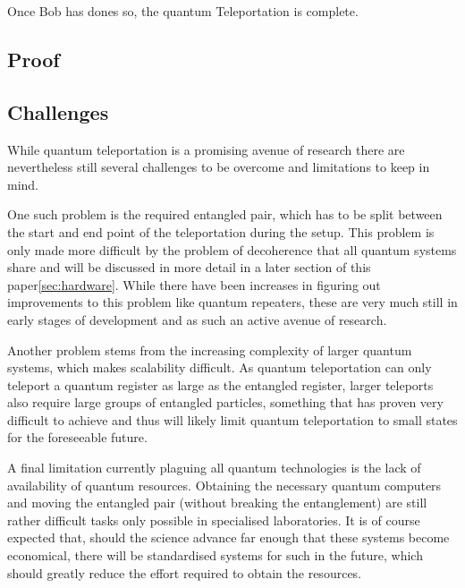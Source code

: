 Once Bob has dones so, the quantum Teleportation is complete.
\subsection{Proof}\label{subsec:proof2}

\subsection{Challenges}\label{subsec:challenges}
While quantum teleportation is a promising avenue of research there are nevertheless still several challenges to be
overcome and limitations to keep in mind.

One such problem is the required entangled pair, which has to be split between the start and end point of the teleportation
during the setup.
This problem is only made more difficult by the problem of decoherence that all quantum systems share and will be
discussed in more detail in a later section of this paper\ref{sec:hardware}.
While there have been increases in figuring out improvements to this problem like quantum repeaters\cite{s}, these are
very much still in early stages of development and as such an active avenue of research.

Another problem stems from the increasing complexity of larger quantum systems, which makes scalability difficult.
As quantum teleportation can only teleport a quantum register as large as the entangled register, larger teleports
also require large groups of entangled particles, something that has proven very difficult to achieve \cite{s} and
thus will likely limit quantum teleportation to small states for the foreseeable future.

A final limitation currently plaguing all quantum technologies is the lack of availability of quantum resources.
Obtaining the necessary quantum computers and moving the entangled pair (without breaking the entanglement) are still
rather difficult tasks only possible in specialised laboratories.
It is of course expected that, should the science advance far enough that these systems become economical, there will
be standardised systems for such in the future, which should greatly reduce the effort required to obtain the resources.
